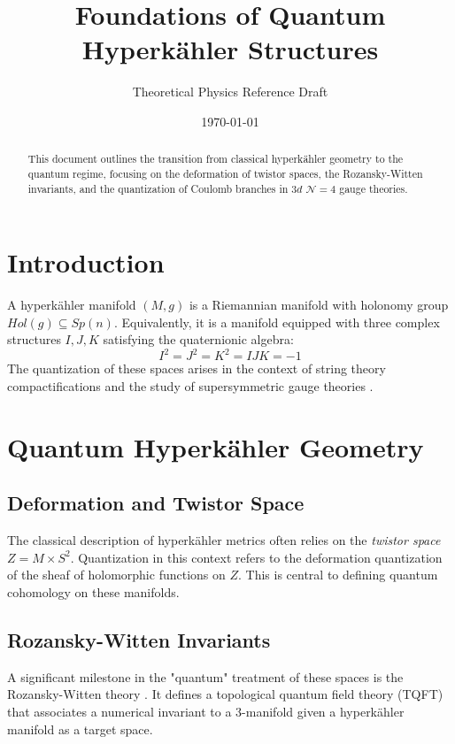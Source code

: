 \documentclass[11pt,a4paper]{article}
\newcommand{\HK}{hyperk\"{a}hler }
\begin{document}
\title{Foundations of Quantum Hyperk\"{a}hler Structures}
\author{Theoretical Physics Reference Draft}
\date{\today}
\maketitle

\begin{abstract}
This document outlines the transition from classical hyperk\"{a}hler geometry to the quantum regime, focusing on the deformation of twistor spaces, the Rozansky-Witten invariants, and the quantization of Coulomb branches in $3d$ $\mathcal{N}=4$ gauge theories.
\end{abstract}

\section{Introduction}
A \HK manifold $(M, g)$ is a Riemannian manifold with holonomy group $Hol(g) \subseteq Sp(n)$. Equivalently, it is a manifold equipped with three complex structures $I, J, K$ satisfying the quaternionic algebra:
\begin{equation}
    I^2 = J^2 = K^2 = IJK = -1
\end{equation}
The quantization of these spaces arises in the context of string theory compactifications and the study of supersymmetric gauge theories \cite{Hitchin1987, Joyce2000}.

\section{Quantum Hyperk\"{a}hler Geometry}

\subsection{Deformation and Twistor Space}
The classical description of \HK metrics often relies on the \textit{twistor space} $Z = M \times S^2$. Quantization in this context refers to the deformation quantization of the sheaf of holomorphic functions on $Z$. This is central to defining quantum cohomology on these manifolds.

\subsection{Rozansky-Witten Invariants}
A significant milestone in the "quantum" treatment of these spaces is the Rozansky-Witten theory \cite{Rozansky1997}. It defines a topological quantum field theory (TQFT) that associates a numerical invariant to a 3-manifold given a \HK manifold as a target space.
\end{document}
